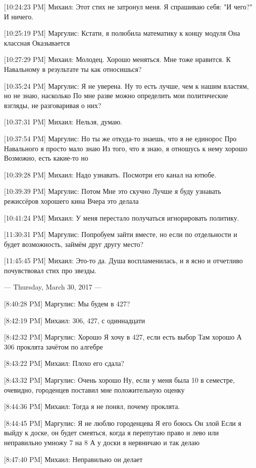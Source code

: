 \documentclass{article}
\begin{document}
[10:24:23 PM] Михаил:
Этот стих не затронул меня. Я спрашиваю себя: "И чего?" И ничего.

[10:25:19 PM] Маргулис:
Кстати, я полюбила математику к концу модуля
 Она классная
 Оказывается

[10:27:29 PM] Михаил:
Молодец. Хорошо меняться. Мне тоже нравится.
 К Навальному в результате ты как относишься?

[10:35:24 PM] Маргулис:
Я не уверена. Ну то есть лучше, чем к нашим властям, но не знаю, насколько
 По мне разве можно определить мои политические взгляды, не разговаривая о них?

[10:37:31 PM] Михаил:
Нельзя, думаю.

[10:37:54 PM] Маргулис:
Но ты же откуда-то знаешь, что я не единорос
 Про Навального я просто мало знаю
 Из того, что я знаю, я отношусь к нему хорошо
 Возможно, есть какие-то но

[10:39:28 PM] Михаил:
Надо узнавать. Посмотри его канал на ютюбе.

[10:39:39 PM] Маргулис:
Потом
 Мне это скучно
 Лучше я буду узнавать режиссёров хорошего кина
 Вчера это делала

[10:41:24 PM] Михаил:
У меня перестало получаться игнорировать политику.

[11:30:31 PM] Маргулис:
Попробуем зайти вместе, но если по отдельности и будет возможность, займём друг другу место?

[11:45:45 PM] Михаил:
Это-то да. Душа воспламенилась, и я ясно и отчетливо почувствовал стих про звезды.

--- Thursday, March 30, 2017 ---

[8:40:28 PM] Маргулис:
Мы будем в 427?

[8:42:19 PM] Михаил:
306, 427, с одиннадцати

[8:42:32 PM] Маргулис:
Хорошо
 Я хочу в 427, если есть выбор
 Там хорошо
 А 306 проклята зачётом по алгебре

[8:43:22 PM] Михаил:
Плохо его сдала?

[8:43:32 PM] Маргулис:
Очень хорошо
 Ну, если у меня была 10 в семестре, очевидно, городенцев поставил мне положительную оценку

[8:44:36 PM] Михаил:
Тогда я не понял, почему проклята.

[8:44:45 PM] Маргулис:
Я не люблю городенцева
 Я его боюсь
 Он злой
 Если я выйду к доске, он будет смеяться, когда я перепутаю право и лево или неправильно умножу 7 на 8
 А у доски я нервничаю и так делаю

[8:47:40 PM] Михаил:
Неправильно он делает
\end{document}
